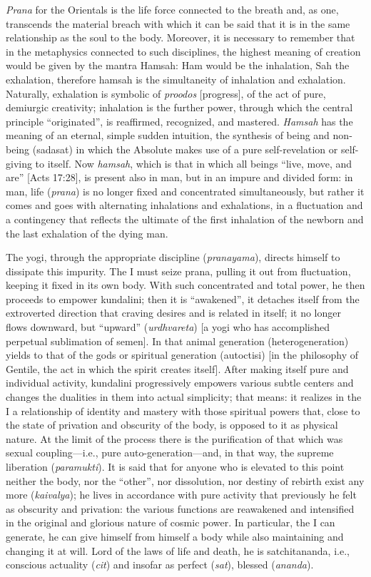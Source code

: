 \textit{Prana} for the Orientals is the life force connected to the breath and, as one, transcends the material breach with which it can be said that it is in the same relationship as the soul to the body. Moreover, it is necessary to remember that in the metaphysics connected to such disciplines, the highest meaning of creation would be given by the mantra Hamsah: Ham would be the inhalation, Sah the exhalation, therefore hamsah is the simultaneity of inhalation and exhalation. Naturally, exhalation is symbolic of \textit{proodos} [progress], of the act of pure, demiurgic creativity; inhalation is the further power, through which the central principle “originated”, is reaffirmed, recognized, and mastered. \textit{Hamsah} has the meaning of an eternal, simple sudden intuition, the synthesis of being and non-being (sadasat) in which the Absolute makes use of a pure self-revelation or self-giving to itself. Now \textit{hamsah}, which is that in which all beings “live, move, and are” [Acts 17:28], is present also in man, but in an impure and divided form: in man, life (\textit{prana}) is no longer fixed and concentrated simultaneously, but rather it comes and goes with alternating inhalations and exhalations, in a fluctuation and a contingency that reflects the ultimate of the first inhalation of the newborn and the last exhalation of the dying man.

The yogi, through the appropriate discipline (\textit{pranayama}), directs himself to dissipate this impurity. The I must seize prana, pulling it out from fluctuation, keeping it fixed in its own body. With such concentrated and total power, he then proceeds to empower kundalini; then it is “awakened”, it detaches itself from the extroverted direction that craving desires and is related in itself; it no longer flows downward, but “upward” (\textit{urdhvareta}) [a yogi who has accomplished perpetual sublimation of semen]. In that animal generation (heterogeneration) yields to that of the gods or spiritual generation (autoctisi) [in the philosophy of Gentile, the act in which the spirit creates itself]. After making itself pure and individual activity, kundalini progressively empowers various subtle centers and changes the dualities in them into actual simplicity; that means: it realizes in the I a relationship of identity and mastery with those spiritual powers that, close to the state of privation and obscurity of the body, is opposed to it as physical nature. At the limit of the process there is the purification of that which was sexual coupling—i.e., pure auto-generation—and, in that way, the supreme liberation (\textit{paramukti}). It is said that for anyone who is elevated to this point neither the body, nor the “other”, nor dissolution, nor destiny of rebirth exist any more (\textit{kaivalya}); he lives in accordance with pure activity that previously he felt as obscurity and privation: the various functions are reawakened and intensified in the original and glorious nature of cosmic power. In particular, the I can generate, he can give himself from himself a body while also maintaining and changing it at will. Lord of the laws of life and death, he is satchitananda, i.e., conscious actuality (\textit{cit}) and insofar as perfect (\textit{sat}), blessed (\textit{ananda}).

